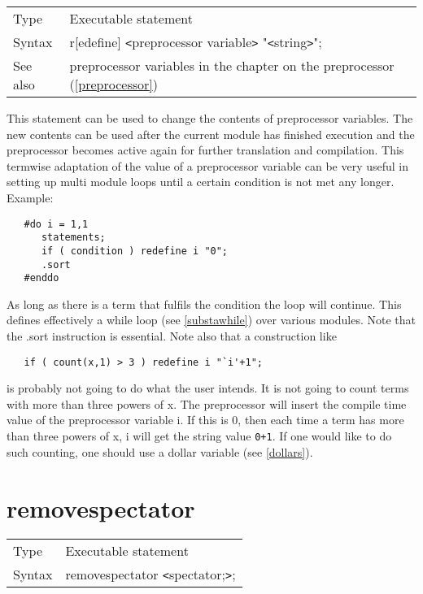 \noindent \begin{tabular}{ll}
Type & Executable statement\\
Syntax & r[edefine] {\tt<}preprocessor variable{\tt>} "{\tt<}string{\tt>}";
\\ See also & preprocessor variables in the chapter on the preprocessor 
    (\ref{preprocessor})
\end{tabular} \vspace{4mm}

\noindent This statement can be used to change the contents 
of preprocessor 
variables. The new contents can be used after 
the current module has finished execution and the preprocessor becomes 
active again for further translation and compilation. 
This termwise adaptation of the value of a preprocessor variable can be 
very useful in setting up multi module loops until a certain condition is 
not met any longer. Example:
\begin{verbatim}
   #do i = 1,1
      statements;
      if ( condition ) redefine i "0";
      .sort
   #enddo
\end{verbatim}
As long as there is a term that fulfils the condition the loop 
will continue. This defines effectively a while loop (see 
\ref{substawhile}) over various modules. Note that the .sort 
instruction is essential. Note also that a construction like
\begin{verbatim}
   if ( count(x,1) > 3 ) redefine i "`i'+1";
\end{verbatim}
is probably not going to do what the user intends. It is not going to count 
terms with more than three powers of x. The preprocessor will insert the 
compile time value of the preprocessor variable i. If this is 0, then each 
time a term has more than three powers of x, i will get the string value 
\verb:0+1:. If one would like to do such counting, one should use a 
dollar variable (see \ref{dollars}). \vspace{10mm}


\section{removespectator}
\label{substaremovespectator}

\noindent \begin{tabular}{ll}
Type & Executable statement\\
Syntax & removespectator {\tt<}spectator;{\tt>};
\end{tabular} \vspace{4mm}

